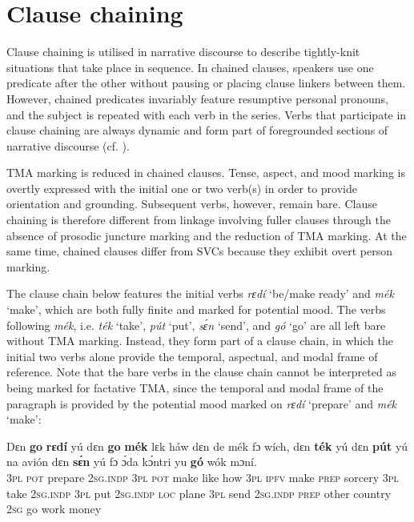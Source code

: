 \section{Clause chaining}\label{sec:11.4}

Clause chaining is utilised in narrative discourse to describe tightly-knit situations that take place in sequence. In chained clauses, speakers use one predicate after the other without pausing or placing clause linkers between them. However, chained predicates invariably feature resumptive personal pronouns, and the subject is repeated with each verb in the series. Verbs that participate in clause chaining are always dynamic and form part of foregrounded sections of narrative discourse (cf. ).


TMA marking is reduced in chained clauses. Tense, aspect, and mood marking is overtly expressed with the initial one or two verb(s) in order to provide orientation and grounding. Subsequent verbs, however, remain bare. Clause chaining is therefore different from linkage involving fuller clauses through the absence of prosodic juncture marking and the reduction of TMA marking. At the same time, chained clauses differ from SVCs because they exhibit overt person marking.



The clause chain below features the initial verbs \textit{rɛdí} ‘be/make ready’ and \textit{mék} ‘make’, which are both fully finite and marked for potential mood. The verbs following \textit{mék}, i.e. \textit{ték} ‘take’, \textit{pút} ‘put’, \textit{sɛ́n} ‘send’, and \textit{gó} ‘go’ are all left bare without TMA marking. Instead, they form part of a clause chain, in which the initial two verbs alone provide the temporal, aspectual, and modal frame of reference. Note that the bare verbs in the clause chain cannot be interpreted as being marked for factative TMA,{\fff} since the temporal and modal frame of the paragraph is provided by the potential mood marked on \textit{rɛdí} ‘prepare’ and \textit{mék} ‘make’:



\ea%
    \label{ex:key:1611}
    \gll Dɛn  \textbf{go}  \textbf{rɛdí}    yú    dɛn  \textbf{go}  \textbf{mék}    lɛk  háw    dɛn  de  mék  
fɔ  wích,  dɛn  \textbf{ték}   yú    dɛn  \textbf{pút}  yú    na  avión
dɛn  \textbf{sɛ́n}    yú    fɔ  ɔ́da    kɔ́ntri   yu  \textbf{gó}  wók    mɔní.\\
\textsc{3pl}  \textsc{pot}  prepare  \textsc{2sg.indp}  \textsc{3pl}  \textsc{pot}  make  like  how    \textsc{3pl}  \textsc{ipfv}  make
\textsc{prep} sorcery  \textsc{3pl}  take    \textsc{2sg.indp}  \textsc{3pl}  put  \textsc{2sg.indp}   \textsc{loc}  plane  
\textsc{3pl}  send  \textsc{2sg.indp}  \textsc{prep}  other  country  \textsc{2sg}  go  work  money\\

